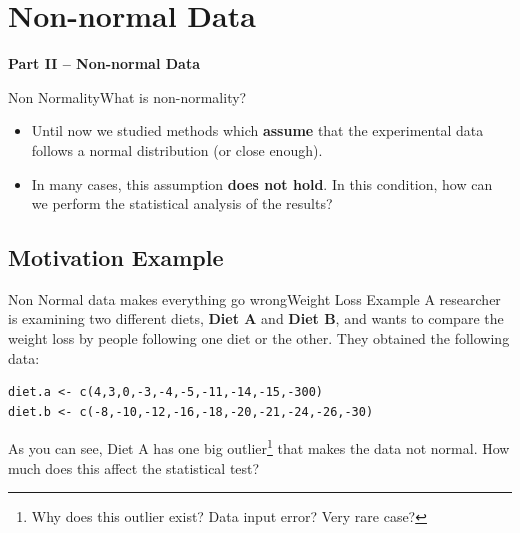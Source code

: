 \section{Non-normal Data}

\begin{frame}

  \begin{center}
    {\bf Part II -- Non-normal Data}
  \end{center}

\end{frame}

\begin{frame}{Non Normality}{What is non-normality?}
  \begin{itemize}
    \item Until now we studied methods which {\bf assume} that the experimental
      data follows a normal distribution (or close enough).\bigskip
    \item In many cases, this assumption {\bf does not hold}. In this condition,
      how can we perform the statistical analysis of the results?
  \end{itemize}
\end{frame}

\subsection{Motivation Example}

\begin{frame}[fragile]{Non Normal data makes everything go wrong}{Weight Loss Example}
A researcher is examining two different diets, {\bf Diet A} and {\bf Diet B},
and wants to compare the weight loss by people following one diet or the other.
They obtained the following data:

\begin{verbatim}
diet.a <- c(4,3,0,-3,-4,-5,-11,-14,-15,-300)
diet.b <- c(-8,-10,-12,-16,-18,-20,-21,-24,-26,-30)
\end{verbatim}
\bigskip

As you can see, Diet A has one big outlier\footnote{Why does this outlier exist? Data input error? Very rare case?} that makes the data not normal. How much does this affect the statistical test?
\end{frame}

